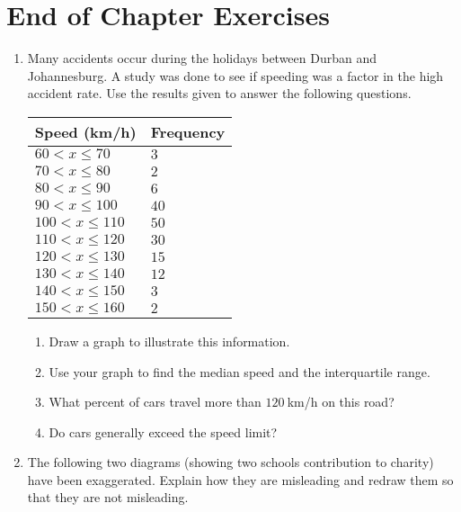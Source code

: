 \section{End of Chapter Exercises}
\begin{enumerate}
\item Many accidents occur during the holidays between Durban and Johannesburg. A study was done to see if speeding was a factor in the high accident rate. Use the results given to answer the following questions.

\begin{center}
\begin{tabular}{|l|l|}
\hline
Speed (km/h) & Frequency \\ 
\hline
 $60<x\leq 70$   & $3 $ \\
 $70<x\leq 80$   & $2 $ \\
 $80<x\leq 90$   & $6 $ \\
 $90<x\leq 100$  & $40$ \\
 $100<x\leq 110$ & $50$ \\
 $110<x\leq 120$ & $30$ \\
 $120<x\leq 130$ & $15$ \\
 $130<x\leq 140$ & $12$ \\
 $140<x\leq 150$ & $3 $ \\
 $150<x\leq 160$ & $2$  \\
\hline
\end{tabular}
\end{center}

	\begin{enumerate}
	\item Draw a graph to illustrate this information. 
	\item Use your graph to find the median speed and the interquartile range.
	\item What percent of cars travel more than $120~$km/h on this road?
	\item Do cars generally exceed the speed limit?
	\end{enumerate}

\item The following two diagrams (showing two schools contribution to charity) have been exaggerated. Explain how they are misleading and redraw them so that they are not misleading.


\end{enumerate}
